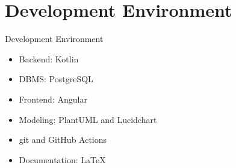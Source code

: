 \section{Development Environment}

\begin{frame}{Development Environment}
    \begin{itemize}
        \item<+-> Backend: Kotlin
        \item<+-> DBMS: PostgreSQL
        \item<+-> Frontend: Angular
        \item<+-> Modeling: PlantUML and Lucidchart
        \item<+-> git and GitHub Actions
        \item<+-> Documentation: \LaTeX\
    \end{itemize}
\end{frame}
